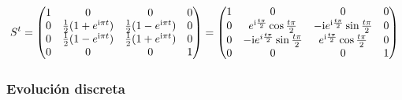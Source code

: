 \begin{equation}\label{eq:SWAP(t)}
S^{t}=\begin{pmatrix}
 1 & 0 & 0 & 0 \\
 0 & \frac{1}{2}(1+e^{\text{i} \pi t}) & \frac{1}{2} (1-e^{\text{i} \pi t}) & 0 \\
 0 & \frac{1}{2}(1-e^{\text{i} \pi t}) & \frac{1}{2}(1+e^{\text{i} \pi t}) & 0 \\
 0 & 0 & 0 & 1
\end{pmatrix}=\begin{pmatrix}
  1 & 0 & 0 & 0 \\
  0 & e^{\text{i}\frac{t\pi}{2}}\cos{\frac{t\pi}{2}} & -\text{i} e^{\text{i}\frac{t\pi}{2}}\sin{\frac{t\pi}{2}} & 0 \\
  0 & -\text{i} e^{i\frac{t\pi}{2}}\sin{\frac{t\pi}{2}} & e^{\text{i}\frac{t\pi}{2}}\cos{\frac{t\pi}{2}}  & 0 \\
  0 & 0 & 0 & 1
 \end{pmatrix}
\end{equation}

\subsubsection{Evolución discreta}

